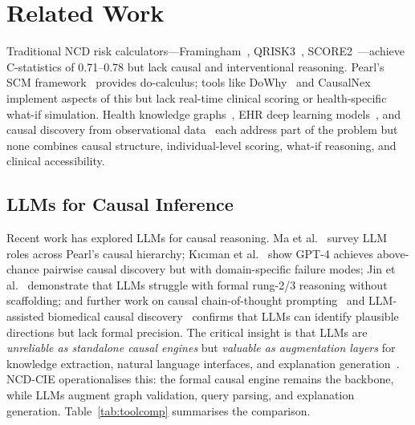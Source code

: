 \documentclass[runningheads]{llncs}
\begin{document}
\section{Related Work}\label{sec:related}

Traditional NCD risk calculators---Framingham~\cite{dagostino2008},
QRISK3~\cite{hippisley2017qrisk3}, SCORE2~\cite{score22021}---achieve
C-statistics of 0.71--0.78 but lack causal and interventional reasoning.
Pearl's SCM framework~\cite{pearl2009causality,hernan2020causal}
provides do-calculus; tools like DoWhy~\cite{sharma2020dowhy} and
CausalNex~\cite{beaumont2021causalnex} implement aspects of this but
lack real-time clinical scoring or health-specific what-if simulation.
Health knowledge graphs~\cite{chandak2023primekg,barabasi2011network},
EHR deep learning models~\cite{li2020behrt,rasmy2021medbert}, and
causal discovery from observational data~\cite{prosperi2020causal}
each address part of the problem but none combines causal structure,
individual-level scoring, what-if reasoning, and clinical
accessibility.

\subsection{LLMs for Causal Inference}\label{sec:llmcausal}

Recent work has explored LLMs for causal reasoning.
Ma et al.~\cite{ma2024causal} survey LLM roles across Pearl's
causal hierarchy; K{\i}c{\i}man et al.~\cite{kiciman2023causal}
show GPT-4 achieves above-chance pairwise causal discovery but
with domain-specific failure modes; Jin et al.~\cite{jin2023cladder}
demonstrate that LLMs struggle with formal rung-2/3 reasoning
without scaffolding; and further work on causal chain-of-thought
prompting~\cite{ban2023causalcot} and LLM-assisted biomedical
causal discovery~\cite{long2023causal} confirms that LLMs can
identify plausible directions but lack formal precision.
The critical insight is that LLMs are \emph{unreliable as standalone
causal engines} but \emph{valuable as augmentation layers} for
knowledge extraction, natural language interfaces, and explanation
generation~\cite{ma2024causal}.
NCD-CIE operationalises this: the formal causal engine remains
the backbone, while LLMs augment graph validation, query parsing,
and explanation generation.
Table~\ref{tab:toolcomp} summarises the comparison.
\end{document}

